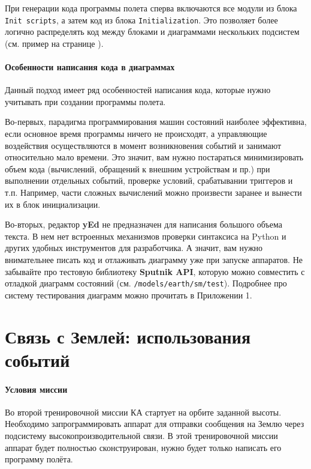 \documentclass[12pt,a4paper]{article}
\begin{document}
При генерации кода программы полета сперва включаются все модули из блока
\verb'Init scripts', а затем код из блока \verb'Initialization'. Это позволяет более
логично распределять код между блоками и диаграммами нескольких подсистем (см. пример на
странице \pageref{MULTIPLE_MODULES}).
 
\paragraph{Особенности написания кода в диаграммах} Данный подход имеет ряд особенностей
написания кода, которые нужно учитывать при создании программы полета.

Во-первых, парадигма программирования машин состояний наиболее эффективна, если основное
время программы ничего не происходят, а управляющие воздействия осуществляются в момент
возникновения событий и занимают относительно мало времени. Это значит, вам нужно
постараться минимизировать объем кода (вычислений, обращений к внешним устройствам и пр.)
при выполнении отдельных событий, проверке условий, срабатывании триггеров и
т.п. Например, части сложных вычислений можно произвести заранее и вынести их в блок
инициализации.

Во-вторых, редактор \textbf{yEd} не предназначен для написания большого объема текста. В нем нет
встроенных механизмов проверки синтаксиса на Python и других удобных инструментов для
разработчика. А значит, вам нужно внимательнее писать код и отлаживать диаграмму уже  при
запуске аппаратов. Не забывайте про тестовую библиотеку \textbf{Sputnik API}, которую
можно совместить с отладкой диаграмм состояний
(см. \verb'/models/earth/sm/test'). Подробнее про систему тестирования диаграмм можно
прочитать в Приложении 1.

\clearpage
\section{Связь с Землей: использования событий}

\paragraph{Условия миссии} Во второй тренировочной миссии КА стартует на орбите заданной высоты. Необходимо
запрограммировать аппарат для отправки сообщения на Землю через подсистему
высокопроизводительной связи. В этой тренировочной миссии аппарат будет полностью
сконструирован, нужно будет только написать его программу полёта.
\end{document}
